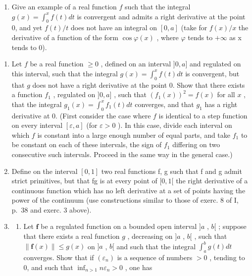 \begin{enumerate}
\def\labelenumi{\alph{enumi})}
\setcounter{enumi}{1}
\tightlist
\item
  Give an example of a real function \(f\) such that the integral \(g(x) = \int_0^x f(t)dt\) is convergent and admits a right derivative at the point 0, and yet \(f(t) / t\) does not have an integral on \([0, a]\) (take for \(f(x)/x\) the derivative of a function of the form \(\cos\varphi(x)\) , where \(\varphi\) tends to \(+\infty\) as x tends to 0).
\end{enumerate}

\begin{enumerate}
\def\labelenumi{\arabic{enumi})}
\setcounter{enumi}{2}
\item
  Let \(f\) be a real function \(\geqslant 0\) , defined on an interval \(]0, a]\) and regulated on this interval, such that the integral \(g(x) = \int_0^x f(t)dt\) is convergent, but that \(g\) does not have a right derivative at the point 0. Show that there exists a function \(f_1\) , regulated on \(]0, a]\) , such that \((f_1(x))^2 = f(x)\) for all \(x\) , that the integral \(g_1(x) = \int_0^x f_1(t)dt\) converges, and that \(g_1\) has a right derivative at 0. (First consider the case where \(f\) is identical to a step function on every interval \([\varepsilon, a]\) (for \(\varepsilon > 0\) ). In this case, divide each interval on which \(f\) is constant into a large enough number of equal parts, and take \(f_1\) to be constant on each of these intervals, the sign of \(f_1\) differing on two consecutive such intervals. Proceed in the same way in the general case.)
\item
  Define on the interval \([0,1]\) two real functions f, g such that f and g admit strict primitives, but that fg is at every point of \([0,1[\) the right derivative of a continuous function which has no left derivative at a set of points having the power of the continuum (use constructions similar to those of exerc. 8 of I, p.~38 and exerc. 3 above).
\item
  \begin{enumerate}
  \def\labelenumii{\alph{enumii})}
  \tightlist
  \item
    Let \(\mathbf{f}\) be a regulated function on a bounded open interval \(]a\) , \(b[\) ; suppose that there exists a real function \(g\) , decreasing on \(]a\) , \(b[\) , such that \(\| \mathbf{f}(x) \| \leqslant g(x)\) on \(]a\) , \(b[\) and such that the integral \(\int_{a}^{b} g(t) dt\) converges. Show that if \((\varepsilon_n)\) is a sequence of numbers \(>0\) , tending to 0, and such that \(\inf_{n > 1} n \varepsilon_n > 0\) , one has
  \end{enumerate}
\end{enumerate}

